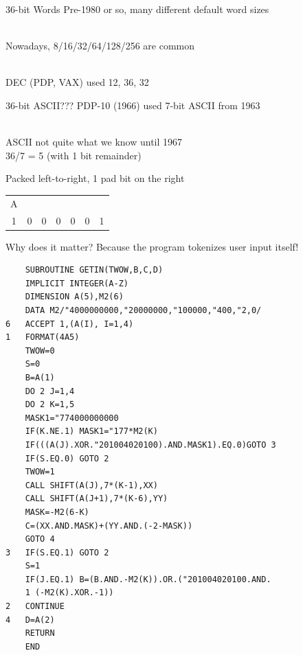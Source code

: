 \documentclass{beamer}
\def\fortran{
  \lstset{
     language=[77]FORTRAN,
     keywordstyle=\bfseries,
     extendedchars=true,
     basicstyle=\footnotesize\ttfamily,
     showstringspaces=false,
     showspaces=false,
     numbersep=9pt,
     tabsize=8,
     breaklines=true,
     showtabs=false,
     captionpos=b
  }
}
\begin{document}
\begin{frame}{36-bit Words}
Pre-1980 or so, many different default word sizes

\ \\

Nowadays, 8/16/32/64/128/256 are common

\ \\
DEC (PDP, VAX) used 12, 36, 32
\end{frame}
\begin{frame}{36-bit ASCII???}
PDP-10 (1966) used 7-bit ASCII from 1963

\ \\

ASCII not quite what we know until 1967
\ \\

36/7 = 5 (with 1 bit remainder)\ \\
\end{frame}
\begin{frame}
Packed left-to-right, 1 pad bit on the right
  \begin{tabular}{|ccccccc|}%
    A & & & & & & \\ %
    1 &
    0 &
    0 &
    0 &
    0 &
    0 &
    1 \\
  \end{tabular}

\end{frame}
\begin{frame}[fragile]{Why does it matter?}
Because the program tokenizes user input itself!

\fortran
\begin{lstlisting}
	SUBROUTINE GETIN(TWOW,B,C,D)
	IMPLICIT INTEGER(A-Z)
	DIMENSION A(5),M2(6)
	DATA M2/"4000000000,"20000000,"100000,"400,"2,0/
6	ACCEPT 1,(A(I), I=1,4)
1	FORMAT(4A5)
	TWOW=0
	S=0
	B=A(1)
	DO 2 J=1,4
	DO 2 K=1,5
	MASK1="774000000000
	IF(K.NE.1) MASK1="177*M2(K)
	IF(((A(J).XOR."201004020100).AND.MASK1).EQ.0)GOTO 3
	IF(S.EQ.0) GOTO 2
	TWOW=1
	CALL SHIFT(A(J),7*(K-1),XX)
	CALL SHIFT(A(J+1),7*(K-6),YY)
	MASK=-M2(6-K)
	C=(XX.AND.MASK)+(YY.AND.(-2-MASK))
	GOTO 4
3	IF(S.EQ.1) GOTO 2
	S=1
	IF(J.EQ.1) B=(B.AND.-M2(K)).OR.("201004020100.AND.
	1 (-M2(K).XOR.-1))
2	CONTINUE
4	D=A(2)
	RETURN
	END
\end{lstlisting}

\end{frame}
\end{document}
